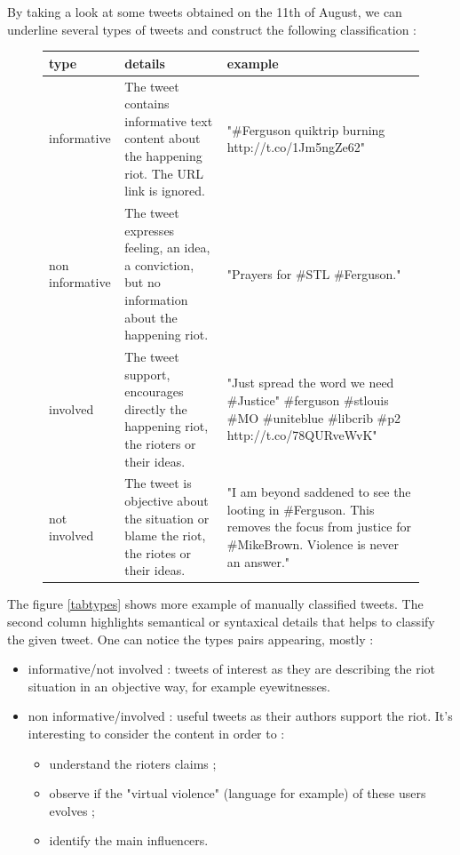 \documentclass[a4paper,12pt]{report}
\begin{document}
\newcommand{\info}[1]{\colorbox{cyan!20}{#1}}
\newcommand{\rass}[1]{\colorbox{red!20}{#1}}
\newcommand{\ninfo}[1]{\colorbox{black!20}{#1}}
\newcommand{\nrass}[1]{\colorbox{green!20}{#1}}

By taking a look at some tweets obtained on the 11th of August, we can underline several types of tweets and construct the following classification :

\begin{figure}[h!]
\centering
\begin{tabular}{l|m{7cm}|m{6cm}}
type & details & example\\
\hline
\hline
\info{informative} & The tweet contains informative text content about the happening riot. The URL link is ignored. & "\#Ferguson quiktrip burning http://t.co/1Jm5ngZe62" \\
\hline
\ninfo{non informative} & The tweet expresses feeling, an idea, a conviction, but no information about the happening riot. & "Prayers for \#STL \#Ferguson." \\
\hline
\hline
\rass{involved} & The tweet support, encourages directly the happening riot, the rioters or their ideas. & "Just spread the word we need \#Justice" \#ferguson \#stlouis \#MO  \#uniteblue \#libcrib \#p2 http://t.co/78QURveWvK" \\
\hline
\nrass{not involved} & The tweet is objective about the situation or blame the riot, the riotes or their ideas. & "I am beyond saddened to see the looting in \#Ferguson. This removes the focus from justice for \#MikeBrown. Violence is never an answer." \\
\end{tabular}
\end{figure}

The figure \ref{tabtypes} shows more example of manually classified tweets. The second column highlights semantical or syntaxical details that helps to classify the given tweet.
One can notice the types pairs appearing, mostly :

\begin{itemize}
\item \info{informative}/\nrass{not involved} : tweets of interest as they are describing the riot situation in an objective way, for example eyewitnesses.
\item \ninfo{non informative}/\rass{involved} : useful tweets as their authors support the riot. It's interesting to consider the content in order to :
\begin{itemize}
\item understand the rioters claims ;
\item observe if the "virtual violence" (language for example) of these users evolves ;
\item identify the main influencers.
\end{itemize}
\end{itemize}
\end{document}
